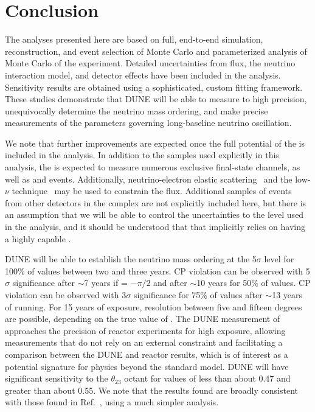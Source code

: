 \section{Conclusion}
\label{sec:conclude}

The analyses presented here are based on full, end-to-end simulation, reconstruction, and event selection of  Monte Carlo and parameterized analysis of  Monte Carlo of the  experiment. Detailed uncertainties from flux, the neutrino interaction model, and detector effects have been included in the analysis. Sensitivity results are obtained using a sophisticated, custom fitting framework. These studies demonstrate that DUNE will be able to measure \deltacp to high precision, unequivocally determine the neutrino mass ordering, and make precise measurements of the parameters governing long-baseline neutrino oscillation.

We note that further improvements are expected once the full potential of the   is included in the analysis. In addition to the samples used explicitly in this analysis, the  is expected to measure numerous exclusive final-state  channels, as well as \nue and  events. Additionally, neutrino-electron elastic scattering~\cite{dune_nue} and the low-$\nu$ technique~\cite{Quintas:1992yv,Yang:2000ju,Tzanov:2005kr,Adamson:2009ju,DeVan:2016rkm,Ren:2017xov} may be used to constrain the flux. Additional samples of events from other detectors in the   complex are not explicitly included here, but there is an assumption that we will be able to control the uncertainties to the level used in the analysis, and it should be understood that that implicitly relies on having a highly capable .

DUNE will be able to establish the neutrino mass ordering at the 5$\sigma$ level for 100\% of \deltacp values between two and three years. CP violation can be observed with 5$\sigma$ significance after $\sim$7 years if \deltacp = $-\pi/2$ and after $\sim$10 years for 50\% of \deltacp values. CP violation can be observed with 3$\sigma$ significance for 75\% of \deltacp values after $\sim$13 years of running. For 15 years of exposure, \deltacp resolution between five and fifteen degrees are possible, depending on the true value of \deltacp. The DUNE measurement of  approaches the precision of reactor experiments for high exposure, allowing measurements that do not rely on an external  constraint and facilitating a comparison between the DUNE and reactor   results, which is of interest as a potential signature for physics beyond the standard model. DUNE will have significant sensitivity to the $\theta_{23}$ octant for values of  less than about 0.47 and greater than about 0.55. We note that the results found are broadly consistent with those found in Ref.~\cite{Acciarri:2015uup}, using a much simpler analysis.


